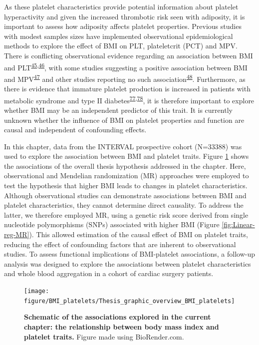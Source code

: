 \documentclass[11pt,twoside]{bristolthesis}
\begin{document}
As these platelet characteristics provide potential information about platelet hyperactivity and given the increased thrombotic risk seen with adiposity, it is important to assess how adiposity affects platelet properties. Previous studies with modest samples sizes have implemented observational epidemiological methods to explore the effect of BMI on PLT, plateletcrit (PCT) and MPV. There is conflicting observational evidence regarding an association between BMI and PLT\textsuperscript{\protect\hyperlink{ref-Furuncuoglu2016}{45},\protect\hyperlink{ref-Han2018a}{46}}, with some studies suggesting a positive association between BMI and MPV\textsuperscript{\protect\hyperlink{ref-Coban2005}{47}} and other studies reporting no such association\textsuperscript{\protect\hyperlink{ref-Heffron2018}{48}}. Furthermore, as there is evidence that immature platelet production is increased in patients with metabolic syndrome and type II diabetes\textsuperscript{\protect\hyperlink{ref-Vaduganathan2008a}{77},\protect\hyperlink{ref-Mijovic2015a}{78}}, it is therefore important to explore whether BMI may be an independent predictor of this trait. It is currently unknown whether the influence of BMI on platelet properties and function are causal and independent of confounding effects.

In this chapter, data from the INTERVAL prospective cohort (N=33388) was used to explore the association between BMI and platelet traits. Figure \ref{fig:BMI-platelet-overview} shows the associations of the overall thesis hypothesis addressed in the chapter. Here, observational and Mendelian randomization (MR) approaches were employed to test the hypothesis that higher BMI leads to changes in platelet characteristics. Although observational studies can demonstrate associations between BMI and platelet characteristics, they cannot determine direct causality. To address the latter, we therefore employed MR, using a genetic risk score derived from single nucleotide polymorphisms (SNPs) associated with higher BMI (Figure \ref{fig:Linear-reg-MR}). This allowed estimation of the causal effect of BMI on platelet traits, reducing the effect of confounding factors that are inherent to observational studies. To assess functional implications of BMI-platelet associations, a follow-up analysis was designed to explore the associations between platelet characteristics and whole blood aggregation in a cohort of cardiac surgery patients.



\begin{figure}
\texttt{[image: figure/BMI\_platelets/Thesis\_graphic\_overview\_BMI\_platelets]} \caption[Schematic of the associations explored in the current chapter: the relationship between body mass index and platelet traits.]{\textbf{Schematic of the associations explored in the current chapter: the relationship between body mass index and platelet traits.} Figure made using BioRender.com.}\label{fig:BMI-platelet-overview}
\end{figure}
\end{document}
